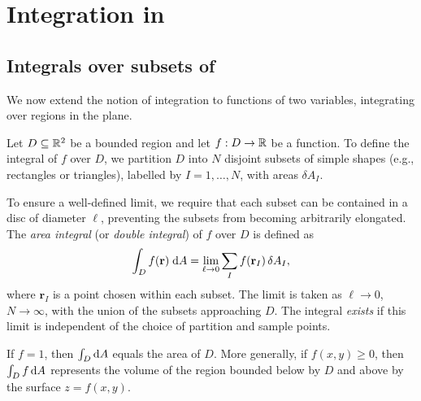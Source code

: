\documentclass[a4paper]{article}
\begin{document}
\section{Integration in }
\subsection{Integrals over subsets of }
We now extend the notion of integration to functions of two variables, integrating over regions in the plane.

\begin{defi}
  Let $D \subseteq \mathbb{R}^2$ be a bounded region and let $f: D \to \mathbb{R}$ be a function. To define the integral of $f$ over $D$, we partition $D$ into $N$ disjoint subsets of simple shapes (e.g., rectangles or triangles), labelled by $I = 1, \ldots, N$, with areas $\delta A_I$.
  \begin{center}
  \end{center}
  To ensure a well-defined limit, we require that each subset can be contained in a disc of diameter $\ell$, preventing the subsets from becoming arbitrarily elongated. The \emph{area integral} (or \emph{double integral}) of $f$ over $D$ is defined as
  \[
    \int_D f(\mathbf{r}) \;\mathrm{d} A = \lim_{\ell \to 0} \sum_{I} f(\mathbf{r}_I) \, \delta A_I,
  \]
  where $\mathbf{r}_I$ is a point chosen within each subset. The limit is taken as $\ell \to 0$, $N \to \infty$, with the union of the subsets approaching $D$. The integral \emph{exists} if this limit is independent of the choice of partition and sample points.
\end{defi}

\begin{rmk}
  If $f = 1$, then $\int_D \mathrm{d} A$ equals the area of $D$. More generally, if $f(x, y) \geq 0$, then $\int_D f \, \mathrm{d} A$ represents the volume of the region bounded below by $D$ and above by the surface $z = f(x, y)$.
\end{rmk}
\end{document}

